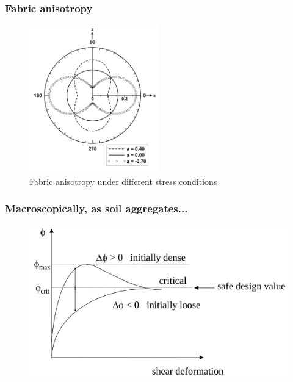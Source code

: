 \documentclass[notes]{beamer}
\begin{document}
\begin{frame}
\frametitle{Fabric anisotropy}
\begin{figure}
	\includegraphics[width=0.5\textwidth]{figs/fabric-anisotropy.png}
	\caption*{Fabric anisotropy under different stress conditions}
\end{figure}
\end{frame}

\begin{frame}
\frametitle{Macroscopically, as soil aggregates...}
\begin{figure}
	\includegraphics[width=\textwidth]{figs/macroscopic-friction.png}
\end{figure}
\end{frame}
\end{document}
